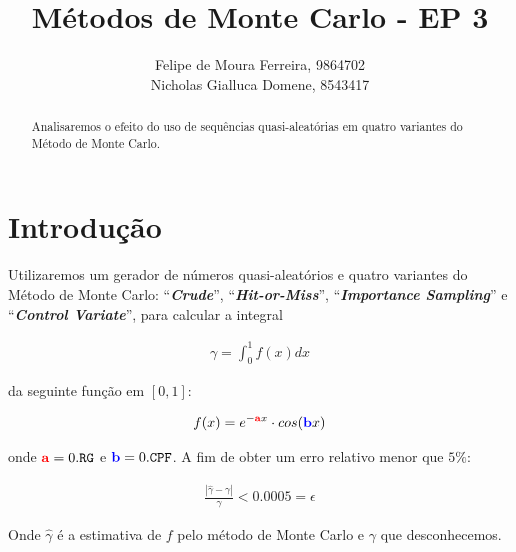 \documentclass[twocolumn,amsmath,amssymb,floatfix]{revtex4}
\begin{document}

\title{Métodos de Monte Carlo - EP 3}

\author{Felipe de Moura Ferreira, 9864702 \\ Nicholas Gialluca Domene, 8543417} 

\begin{abstract}
\baselineskip 11pt
Analisaremos o efeito do uso de sequências quasi-aleatórias em quatro variantes do Método de Monte Carlo.
\end{abstract}

\maketitle

\section{Introdução}

Utilizaremos um gerador de números quasi-aleatórios e quatro variantes do Método de Monte Carlo: ``\textbf{\textit{Crude}}'', ``\textbf{\textit{Hit-or-Miss}}'', ``\textbf{\textit{Importance Sampling}}'' e ``\textbf{\textit{Control Variate}}'', para calcular a integral

\begin{eqnarray}
\gamma = \int_{0}^{1} f(x)dx
\end{eqnarray} 
 
da seguinte função em $[0, 1]$:

\begin{eqnarray}
f(x) = e^{-\mathbf{\color{red}a}x} \cdot cos{(\mathbf{\color{blue}b}x)}
\end{eqnarray}

onde $\mathbf{\color{red}a} = 0.\mathtt{RG}$ e $\mathbf{\color{blue}b} = 0.\mathtt{CPF}$. A fim de obter um erro relativo menor que $5\%$:

\begin{eqnarray}
\frac{| \hat{\gamma} - \gamma |}{\gamma} < 0.0005 = \epsilon
\end{eqnarray}

Onde $\hat{\gamma}$ é a estimativa de $f$ pelo método de Monte Carlo e $\gamma$ que desconhecemos.
\end{document}
